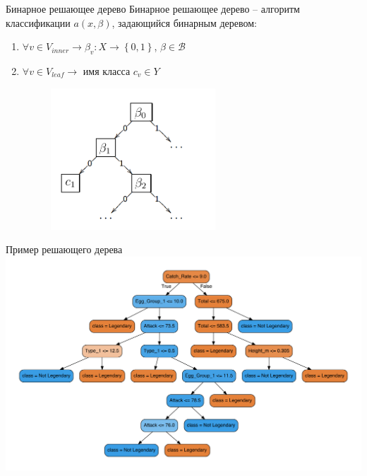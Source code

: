 \documentclass[10pt]{beamer}
\begin{document}
\begin{frame}{Бинарное решающее дерево}
	Бинарное решающее дерево -- алгоритм классификации $a(x, \beta)$, задающийся бинарным деревом:\\
	\begin{enumerate}[--]
	\item $\forall v \in V_{inner} \rightarrow \beta_v: X \rightarrow \left\{ 0,1\right\}$, $\beta \in \mathscr{B}$
	\item $\forall v \in V_{leaf} \rightarrow $ имя класса $c_v \in Y$\\
	
	\begin{figure}[htbp]
	  \includegraphics[height=150pt, keepaspectratio = true]{images/binary_tree}   
	\end{figure}
	\end{enumerate}
\end{frame}

\begin{frame}{Пример решающего дерева}
	  \includegraphics[height=\textheight, width=\textwidth, keepaspectratio = true]{images/pokemons-tree}   
\end{frame}
\end{document}
